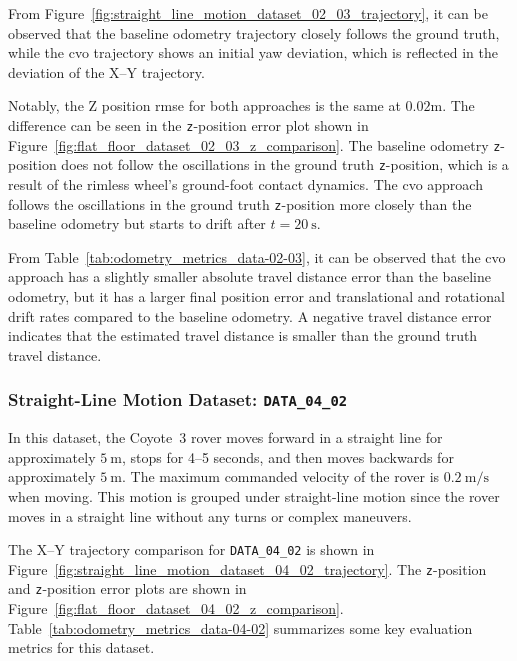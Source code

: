 \documentclass[report.tex]{subfiles}
\begin{document}
        
    From Figure~\ref{fig:straight_line_motion_dataset_02_03_trajectory}, it can be observed that the baseline odometry trajectory closely follows the ground truth, while the \gls{cvo} trajectory shows an initial yaw deviation, which is reflected in the deviation of the X--Y trajectory. 
    
    Notably, the Z position \gls{rmse} for both approaches is the same at $0.02 \mathrm{m}$. The difference can be seen in the \texttt{z}-position error plot shown in Figure~\ref{fig:flat_floor_dataset_02_03_z_comparison}. The baseline odometry \texttt{z}-position does not follow the oscillations in the ground truth \texttt{z}-position, which is a result of the rimless wheel's ground-foot contact dynamics. The \gls{cvo} approach follows the oscillations in the ground truth \texttt{z}-position more closely than the baseline odometry but starts to drift after $t=20~\mathrm{s}$. 

    From Table~\ref{tab:odometry_metrics_data-02-03}, it can be observed that the \gls{cvo} approach has a slightly smaller absolute travel distance error than the baseline odometry, but it has a larger final position error and translational and rotational drift rates compared to the baseline odometry. A negative travel distance error indicates that the estimated travel distance is smaller than the ground truth travel distance.

    \FloatBarrier

    \subsubsection{Straight-Line Motion Dataset: \texttt{DATA\_04\_02}}  \label{subsubsec:straightLineD3_04_02}

    In this dataset, the Coyote~3 rover moves forward in a straight line for approximately $5~\mathrm{m}$, stops for 4--5 seconds, and then moves backwards for approximately $5~\mathrm{m}$. The maximum commanded velocity of the rover is $0.2~\mathrm{m/s}$ when moving. This motion is grouped under straight-line motion since the rover moves in a straight line without any turns or complex maneuvers. 

    The X--Y trajectory comparison for \texttt{DATA\_04\_02} is shown in Figure~\ref{fig:straight_line_motion_dataset_04_02_trajectory}. The \texttt{z}-position and \texttt{z}-position error plots are shown in Figure~\ref{fig:flat_floor_dataset_04_02_z_comparison}. Table~\ref{tab:odometry_metrics_data-04-02} summarizes some key evaluation metrics for this dataset.
    
\end{document}
